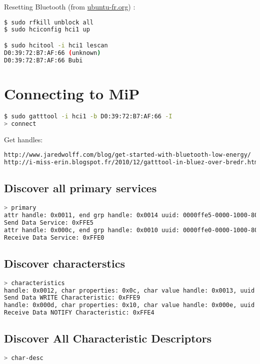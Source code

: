 \documentclass[a4paper,10pt]{article}
\begin{document}
Resetting Bluetooth (from 
\href{http://doc.ubuntu-fr.org/bluetooth\#problemes\_connus}{ubuntu-fr.org}) :
\begin{lstlisting}[language=bash]
$ sudo rfkill unblock all
$ sudo hciconfig hci1 up

$ sudo hcitool -i hci1 lescan
D0:39:72:B7:AF:66 (unknown)
D0:39:72:B7:AF:66 Bubi
\end{lstlisting}

\section{Connecting to MiP}

\begin{lstlisting}[language=bash]
$ sudo gatttool -i hci1 -b D0:39:72:B7:AF:66 -I
> connect
\end{lstlisting}

Get handles:
\begin{lstlisting}[language=bash]
http://www.jaredwolff.com/blog/get-started-with-bluetooth-low-energy/ 
http://i-miss-erin.blogspot.fr/2010/12/gatttool-in-bluez-over-bredr.html 
\end{lstlisting}

\subsection{Discover all primary services}

\begin{lstlisting}[language=bash]
> primary
attr handle: 0x0011, end grp handle: 0x0014 uuid: 0000ffe5-0000-1000-8000-00805f9b34fb
Send Data Service: 0xFFE5
attr handle: 0x000c, end grp handle: 0x0010 uuid: 0000ffe0-0000-1000-8000-00805f9b34fb
Receive Data Service: 0xFFE0
\end{lstlisting}

\subsection{Discover characterstics}
\begin{lstlisting}[language=bash]
> characteristics
handle: 0x0012, char properties: 0x0c, char value handle: 0x0013, uuid: 0000ffe9-0000-1000-8000-00805f9b34fb
Send Data WRITE Characteristic: 0xFFE9
handle: 0x000d, char properties: 0x10, char value handle: 0x000e, uuid: 0000ffe4-0000-1000-8000-00805f9b34fb
Receive Data NOTIFY Characteristic: 0xFFE4
\end{lstlisting}

\subsection{Discover All Characteristic Descriptors}
\begin{lstlisting}[language=bash]
> char-desc
\end{lstlisting}
\end{document}

